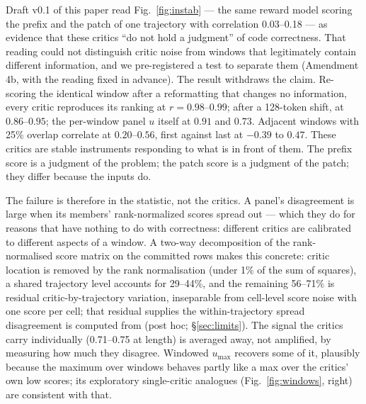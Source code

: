 \documentclass[11pt]{article}
\begin{document}
Draft v0.1 of this paper read Fig.~\ref{fig:instab} --- the same reward model scoring the prefix and the patch of one trajectory with correlation 0.03--0.18 --- as evidence that these critics ``do not hold a judgment'' of code correctness. That reading could not distinguish critic noise from windows that legitimately contain different information, and we pre-registered a test to separate them (Amendment 4b, with the reading fixed in advance). The result withdraws the claim. Re-scoring the identical window after a reformatting that changes no information, every critic reproduces its ranking at $r=0.98$--$0.99$; after a 128-token shift, at $0.86$--$0.95$; the per-window panel $u$ itself at $0.91$ and $0.73$. Adjacent windows with 25\% overlap correlate at $0.20$--$0.56$, first against last at $-0.39$ to $0.47$. These critics are stable instruments responding to what is in front of them. The prefix score is a judgment of the problem; the patch score is a judgment of the patch; they differ because the inputs do.

The failure is therefore in the statistic, not the critics. A panel's disagreement is large when its members' rank-normalized scores spread out --- which they do for reasons that have nothing to do with correctness: different critics are calibrated to different aspects of a window. A two-way decomposition of the rank-normalised score matrix on the committed rows makes this concrete: critic location is removed by the rank normalisation (under 1\% of the sum of squares), a shared trajectory level accounts for 29--44\%, and the remaining 56--71\% is residual critic-by-trajectory variation, inseparable from cell-level score noise with one score per cell; that residual supplies the within-trajectory spread disagreement is computed from (post hoc; \S\ref{sec:limits}). The signal the critics carry individually (0.71--0.75 at length) is averaged away, not amplified, by measuring how much they disagree. Windowed $u_{\max}$ recovers some of it, plausibly because the maximum over windows behaves partly like a max over the critics' own low scores; its exploratory single-critic analogues (Fig.~\ref{fig:windows}, right) are consistent with that.
\end{document}
